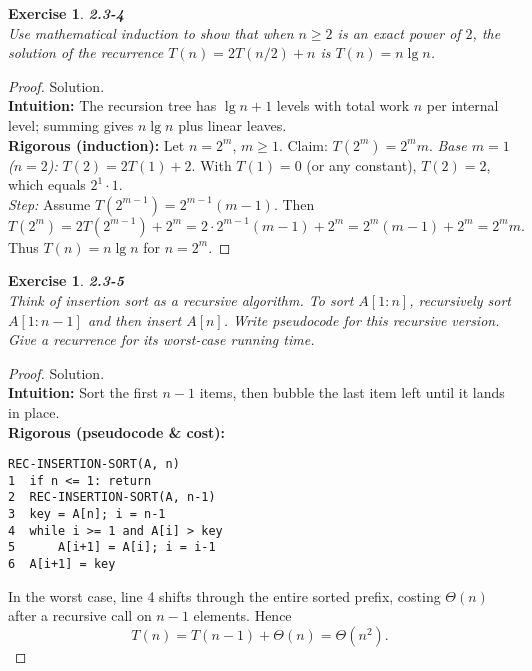 \documentclass[12pt]{article}
\newtheorem{exercise}[theorem]{Exercise}
\theoremstyle{definition}
\begin{document}
\newpage

\begin{exercise}
\noindent
\textbf{2.3-4}\\
\noindent
Use mathematical induction to show that when $n\ge 2$ is an exact power of $2$,
the solution of the recurrence $T(n)=2T(n/2)+n$ is $T(n)=n\lg n$.
\end{exercise}

\vspace{1pt}

\begin{proof}
Solution.\\

\noindent
\textbf{Intuition:} The recursion tree has $\lg n+1$ levels with total work $n$
per internal level; summing gives $n\lg n$ plus linear leaves.\\

\noindent
\textbf{Rigorous (induction):} Let $n=2^m$, $m\ge1$. Claim: $T(2^m)=2^m m$.
\emph{Base $m=1$ ($n=2$):} $T(2)=2T(1)+2$. With $T(1)=0$ (or any constant),
$T(2)=2$, which equals $2^1\cdot1$.\\
\emph{Step:} Assume $T(2^{m-1})=2^{m-1}(m-1)$. Then
\[
T(2^m)=2T(2^{m-1})+2^m
=2\cdot 2^{m-1}(m-1)+2^m
=2^m(m-1)+2^m
=2^m m.
\]
Thus $T(n)=n\lg n$ for $n=2^m$.
\end{proof}

\newpage

\begin{exercise}
\noindent
\textbf{2.3-5}\\
\noindent
Think of insertion sort as a recursive algorithm. To sort $A[1:n]$, recursively
sort $A[1:n-1]$ and then insert $A[n]$. Write pseudocode for this recursive
version. Give a recurrence for its worst-case running time.
\end{exercise}

\vspace{1pt}

\begin{proof}
Solution.\\

\noindent
\textbf{Intuition:} Sort the first $n\!-\!1$ items, then bubble the last item left
until it lands in place.\\

\noindent
\textbf{Rigorous (pseudocode \& cost):}
\begin{verbatim}
REC-INSERTION-SORT(A, n)
1  if n <= 1: return
2  REC-INSERTION-SORT(A, n-1)
3  key = A[n]; i = n-1
4  while i >= 1 and A[i] > key
5      A[i+1] = A[i]; i = i-1
6  A[i+1] = key
\end{verbatim}
In the worst case, line 4 shifts through the entire sorted prefix, costing
$\Theta(n)$ after a recursive call on $n-1$ elements. Hence
\[
T(n)=T(n-1)+\Theta(n)=\Theta(n^2).
\]
\end{proof}
\end{document}
